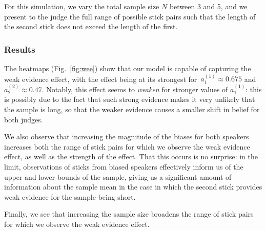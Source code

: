 \documentclass[10pt,letterpaper]{article}
\begin{document}
For this simulation, we vary the total sample size $N$ between 3 and 5, and we present to the judge the full range of possible stick pairs 
such that the length of the second stick does not exceed the length of the first.

\subsubsection{Results}
The heatmaps (Fig.~\ref{fig:wee}) show that our model is capable of capturing the weak evidence effect, with the effect being at its 
strongest for~${a_1^{(1)} \approx 0.675}$ and~${a_2^{(2)} \approx 0.47}$. Notably, this effect seems to \textit{weaken} for
stronger values of $a_1^{(1)}$: this is possibly due to the fact that such strong evidence makes it very unlikely that
the sample is long, so that the weaker evidence causes a smaller shift in belief for both judges.

We also observe that increasing the magnitude of the biases for both speakers increases both the range 
of stick pairs for which we observe the weak evidence effect, as well as the strength of the effect. That this occurs is
no surprise: in the limit, observations of sticks from biased speakers effectively inform us of the upper and lower bounds
of the sample, giving us a significant amount of information about the sample mean in the case in which the second stick
provides weak evidence for the sample being short.

Finally, we see that increasing the sample size broadens the range of stick pairs for which we observe the weak evidence
effect.
\end{document}
